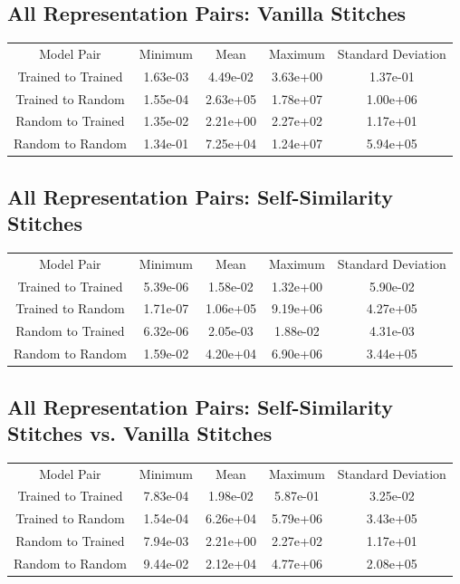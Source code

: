 \documentclass{article} %
\begin{document}
\subsection*{All Representation Pairs: Vanilla Stitches}
\begin{tabular}{c c c c c}
   Model Pair&Minimum&Mean&Maximum&Standard Deviation\\
   Trained to Trained&1.63e-03&4.49e-02&3.63e+00&1.37e-01\\
   Trained to Random&1.55e-04&2.63e+05&1.78e+07&1.00e+06\\
   Random to Trained&1.35e-02&2.21e+00&2.27e+02&1.17e+01\\
   Random to Random&1.34e-01&7.25e+04&1.24e+07&5.94e+05\\
\end{tabular}

\subsection*{All Representation Pairs: Self-Similarity Stitches}
\begin{tabular}{c c c c c}
   Model Pair&Minimum&Mean&Maximum&Standard Deviation\\
   Trained to Trained&5.39e-06&1.58e-02&1.32e+00&5.90e-02\\
   Trained to Random&1.71e-07&1.06e+05&9.19e+06&4.27e+05\\
   Random to Trained&6.32e-06&2.05e-03&1.88e-02&4.31e-03\\
   Random to Random&1.59e-02&4.20e+04&6.90e+06&3.44e+05\\
\end{tabular}

\subsection*{All Representation Pairs: Self-Similarity Stitches vs. Vanilla Stitches}
\begin{tabular}{c c c c c}
   Model Pair&Minimum&Mean&Maximum&Standard Deviation\\
   Trained to Trained&7.83e-04&1.98e-02&5.87e-01&3.25e-02\\
   Trained to Random&1.54e-04&6.26e+04&5.79e+06&3.43e+05\\
   Random to Trained&7.94e-03&2.21e+00&2.27e+02&1.17e+01\\
   Random to Random&9.44e-02&2.12e+04&4.77e+06&2.08e+05\\
\end{tabular}
\end{document}
